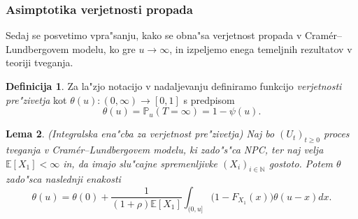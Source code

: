 \documentclass[12pt, a4paper, reqno]{amsart}
\theoremstyle{definition}
\newtheorem{definicija}{Definicija}[section]
\theoremstyle{plain}
\newtheorem{lema}[definicija]{Lema}
\newcommand{\N}{\mathbb{N}}
\newcommand{\E}{\mathbb{E}}
\newcommand{\Prob}{\mathbb{P}}
\newcommand{\1}{\mathds{1}}
\begin{document}
        \subsubsection{Asimptotika verjetnosti propada}
            Sedaj se posvetimo vpra"sanju, kako se obna"sa verjetnost propada v Cramér--Lundbergovem modelu,
            ko gre $u\rightarrow\infty$, in izpeljemo enega temeljnih rezultatov v teoriji tveganja.

            \begin{definicija}
                Za la"zjo notacijo v nadaljevanju definiramo funkcijo \textit{verjetnosti pre"zivetja} kot
                $\theta(u):(0, \infty) \to [0, 1]$ s predpisom
                \begin{equation*}
                    \theta(u) = \Prob_u\left(T=\infty\right) = 1 - \psi(u).
                \end{equation*}
                \label{def:verjetnostPrezivetja}
            \end{definicija}

            \begin{lema}(Integralska ena"cba za verjetnost pre"zivetja)
                Naj bo $(U_t)_{t\geq0}$ proces tveganja v Cramér--Lundbergovem modelu, ki zado"s"ca NPC, ter naj 
                velja $\E\left[X_1\right]<\infty$ in, da imajo slu"cajne spremenljivke $(X_i)_{i\in\N}$ 
                gostoto. Potem $\theta$ zado"sca naslednji enakosti
                \begin{equation}
                    \theta(u) = \theta(0) + \frac{1}{(1+\rho)\E\left[X_1\right]} \int_{(0, u]}\bigl(1 - F_{X_1}(x)\bigr)\theta(u - x)dx.
                    \label{eq:verjetnostPrezivetja}
                \end{equation}
                \label{lema:verjetnostPrezivetja}
            \end{lema}
\end{document}
